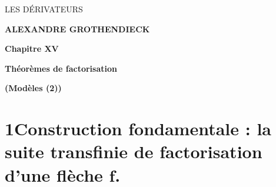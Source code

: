 \dgrchunkbegin

\printedpage{---}

\begin{center}
{\Large\textsf{LES DÉRIVATEURS}}

\bigskip

\textbf{ALEXANDRE GROTHENDIECK}

\vspace{2cm}

\textbf{Chapitre XV}

\medskip

\textbf{Théorèmes de factorisation}

\textbf{(Modèles (2))}
\end{center}

\clearpage

\printedpage{---}


\clearpage



\section*{1\quad Construction fondamentale : la suite transfinie de factorisation d'une flèche $\boldsymbol{f}$.}

